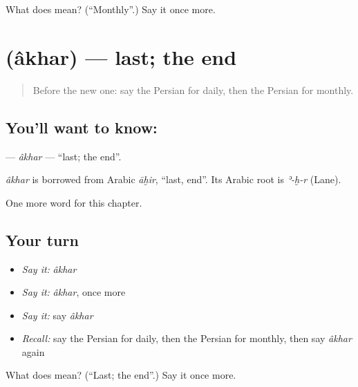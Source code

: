 \begin{tcolorbox}[breakable,colback=teal!4,colframe=teal!35!black,title={Before you move on}]
What does  mean? (\textquotedblleft{}Monthly\textquotedblright{}.) Say it once more.
\end{tcolorbox}
\section[\texorpdfstring{\fa{آخر} (âkhar)}{آخر (âkhar)}]{ (âkhar) — last; the end}

\label{lesson:FA-C152-akhar}



\begin{quote}
Before the new one: say the Persian for daily, then the Persian for monthly.
\end{quote}

\subsection*{You'll want to know: }
\textbf{} — \emph{âkhar} — \textquotedblleft{}last; the end\textquotedblright{}.

\begin{cousinweb}
\emph{âkhar} is borrowed from Arabic \emph{āḫir}, \textquotedblleft{}last, end\textquotedblright{}. Its Arabic root is \emph{ʾ-ḫ-r} (Lane).
\end{cousinweb}

\begin{grammarlens}[title={What you've built}]
One more word for this chapter.
\end{grammarlens}

\subsection*{Your turn}
\begin{itemize}
\raggedright
  \item \emph{Say it:} \emph{âkhar}
  \item \emph{Say it:} \emph{âkhar}, once more
  \item \emph{Say it:} say \emph{âkhar}
  \item \emph{Recall:} say the Persian for daily, then the Persian for monthly, then say \emph{âkhar} again
\end{itemize}

\begin{tcolorbox}[breakable,colback=teal!4,colframe=teal!35!black,title={Before you move on}]
What does  mean? (\textquotedblleft{}Last; the end\textquotedblright{}.) Say it once more.
\end{tcolorbox}
